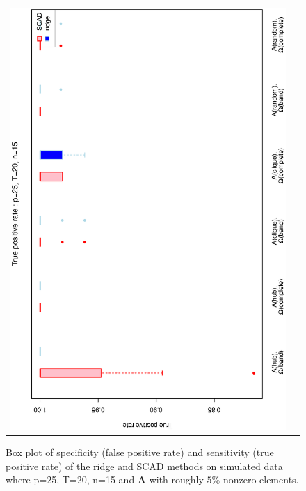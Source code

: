 \documentclass[a4paper]{article}
\begin{document}
\begin{figure}[h!]
\begin{tabular}{cc}
\includegraphics[scale=0.45,angle=270]{ROCtpr25T20N15_5.eps}
\end{tabular}
\caption{Box plot of specificity (false positive rate) and sensitivity (true positive rate) of the ridge and SCAD methods on simulated data where p=25, T=20,  n=15  and $\mathbf{A}$ with roughly $5\%$ nonzero elements.}
\label{figSM:RocP25T20N15_5}
\end{figure}

\end{document}
